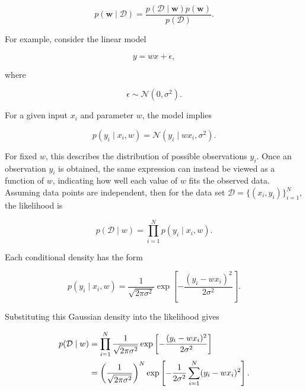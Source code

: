 \documentclass[10pt,twocolumn]{memoir}
\begin{document}
\begin{equation}
    p(\mathbf{w}\mid\mathcal{D}) = \frac{p(\mathcal{D}\mid\mathbf{w})p(\mathbf{w})}{p(\mathcal{D})}.
\label{eq:c1_bayes_posterior}
\end{equation}

For example, consider the linear model

\begin{equation}
    y = wx + \epsilon,
\end{equation}

where

\begin{equation}
    \epsilon \sim \mathcal{N}(0,\sigma^2).
\end{equation}

For a given input $x_i$ and parameter $w$, the model implies

\begin{equation}
    p(y_i\mid x_i,w) = \mathcal{N}(y_i\mid wx_i,\sigma^2).
\end{equation}

For fixed $w$, this describes the distribution of possible observations $y_i$. Once an observation $y_i$ is obtained, the same expression can instead be viewed as a function of $w$, indicating how well each value of $w$ fits the observed data. Assuming data points are independent, then for the data set $\mathcal{D}=\{(x_i,y_i)\}_{i=1}^{N}$, the likelihood is

\begin{equation}
    p(\mathcal{D}\mid w) = \prod_{i=1}^{N} p(y_i\mid x_i,w).
\end{equation}

Each conditional density has the form

\begin{equation}
    p(y_i\mid x_i,w) = \frac{1}{\sqrt{2\pi\sigma^2}} \exp \left[-\frac{(y_i-wx_i)^2}{2\sigma^2}\right].
\end{equation}

Substituting this Gaussian density into the likelihood gives

\begin{align}
    p(\mathcal{D}\mid w)
    &= \prod_{i=1}^{N} \frac{1}{\sqrt{2\pi\sigma^2}} \exp \left[-\frac{(y_i-wx_i)^2}{2\sigma^2}\right]
    \notag \\
    &= \left(\frac{1}{\sqrt{2\pi\sigma^2}}\right)^N \exp \left[-\frac{1}{2\sigma^2}\sum_{i=1}^{N}(y_i-wx_i)^2\right].
\label{eq:c1_likelihood_and_residual}
\end{align}
\end{document}

